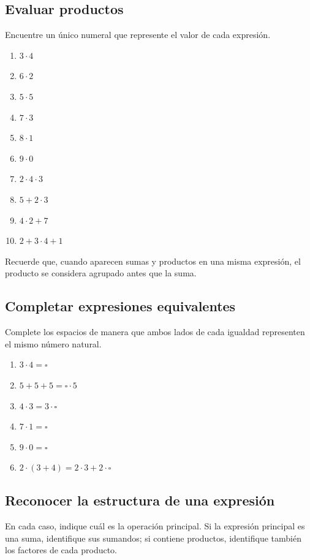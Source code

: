 \subsection*{Evaluar productos}

Encuentre un único numeral que represente el valor de cada expresión.

\begin{enumerate}
\item \(3\cdot4\)
\item \(6\cdot2\)
\item \(5\cdot5\)
\item \(7\cdot3\)
\item \(8\cdot1\)
\item \(9\cdot0\)
\item \(2\cdot4\cdot3\)
\item \(5+2\cdot3\)
\item \(4\cdot2+7\)
\item \(2+3\cdot4+1\)
\end{enumerate}

Recuerde que, cuando aparecen sumas y productos en una misma expresión, el producto se considera agrupado antes que la suma.

\subsection*{Completar expresiones equivalentes}

Complete los espacios de manera que ambos lados de cada igualdad representen el mismo número natural.

\begin{enumerate}
\item \(3\cdot4=\square\)
\item \(5+5+5=\square\cdot5\)
\item \(4\cdot3=3\cdot\square\)
\item \(7\cdot1=\square\)
\item \(9\cdot0=\square\)
\item \(2\cdot(3+4)=2\cdot3+2\cdot\square\)
\end{enumerate}

\subsection*{Reconocer la estructura de una expresión}

En cada caso, indique cuál es la operación principal. Si la expresión principal es una suma, identifique sus sumandos; si contiene productos, identifique también los factores de cada producto.

